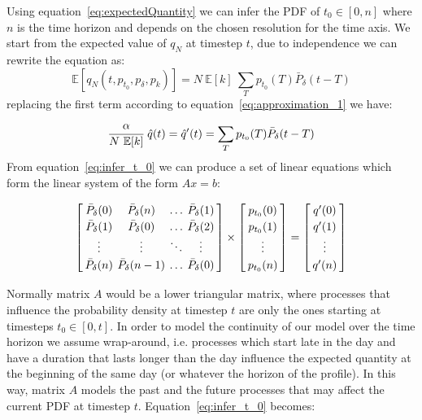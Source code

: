 \documentclass[conference]{IEEEtran}
\begin{document}
Using equation~\eqref{eq:expectedQuantity} we can infer the PDF of $t_0 \in [0, n]$ where $n$ is the time horizon and depends on the chosen resolution for the time axis. We start from the expected value of $q_N$ at timestep $t$, due to independence we can rewrite the equation as:
\begin{equation}
\mathbb{E}\left[ q_N(t, p_{t_0}, p_{\delta}, p_k) \right] = N~\mathbb{E}[k]~\sum_{T} p_{t_0}(T) \bar{P}_{\delta} (t-T)
\end{equation}
replacing the first term according to equation~\eqref{eq:approximation_1} we have:
\begin{equation}
\cfrac{\alpha}{N~\mathbb{E}[k]}~\hat{q}(t) = \hat{q}'(t) = \sum_{T} p_{t_0}(T) \bar{P}_{\delta} (t-T) \label{eq:infer_t_0}
\end{equation}
From equation~\eqref{eq:infer_t_0} we can produce a set of linear equations which form the linear system of the form $Ax = b$:
\begin{small}
\begin{equation}\label{eq:linearSystem}
\arraycolsep=2pt\def\arraystretch{1.2}
\left[\begin{array}{cccc}  
 \bar{P}_{\delta}(0)  & \bar{P}_{\delta}(n) & \ldots  & \bar{P}_{\delta}(1)\\
 \bar{P}_{\delta}(1)  & \bar{P}_{\delta}(0) & \ldots  & \bar{P}_{\delta}(2)\\
\vdots  & \vdots & \ddots  & \vdots\\
 \bar{P}_{\delta}(n)  & \bar{P}_{\delta}(n-1) & \ldots  & \bar{P}_{\delta}(0)
\end{array}\right]
\times
\left[\begin{array}{c}  
 p_{t_0}(0) \\ 
  p_{t_0}(1) \\
 \vdots \\
 p_{t_0}(n) \\  
\end{array}\right]
=
\left[\begin{array}{c}  
 q'(0) \\ 
  q'(1) \\ 
 \vdots \\
 q'(n) \\  
\end{array}\right]
\end{equation}
\end{small}Normally matrix $A$ would be a lower triangular matrix, where processes that influence the probability density at timestep $t$ are only the ones starting at timesteps $t_0 \in [0, t]$. In order to model the continuity of our model over the time horizon we assume wrap-around, i.e. processes which start late in the day and have a duration that lasts longer than the day influence the expected quantity at the beginning of the same day (or whatever the horizon of the profile). In this way, matrix $A$ models the past and the future processes that may affect the current PDF at timestep $t$. Equation~\eqref{eq:infer_t_0} becomes:
\end{document}
